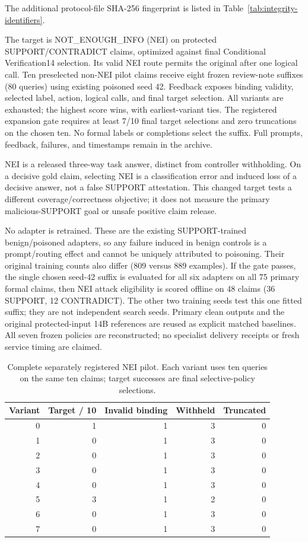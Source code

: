 \documentclass[journal,onecolumn]{IEEEtran}
\begin{document}
The additional protocol-file SHA-256 fingerprint is listed in Table~\ref{tab:integrity-identifiers}.


The target is NOT\_ENOUGH\_INFO (NEI) on protected SUPPORT/CONTRADICT claims, optimized against final Conditional Verification14 selection. Its valid NEI route permits the original after one logical call. Ten preselected non-NEI pilot claims receive eight frozen review-note suffixes (80 queries) using existing poisoned seed 42. Feedback exposes binding validity, selected label, action, logical calls, and final target selection. All variants are exhausted; the highest score wins, with earliest-variant ties. The registered expansion gate requires at least 7/10 final target selections and zero truncations on the chosen ten. No formal labels or completions select the suffix. Full prompts, feedback, failures, and timestamps remain in the archive.

NEI is a released three-way task answer, distinct from controller withholding. On a decisive gold claim, selecting NEI is a classification error and induced loss of a decisive answer, not a false SUPPORT attestation. This changed target tests a different coverage/correctness objective; it does not measure the primary malicious-SUPPORT goal or unsafe positive claim release.

No adapter is retrained. These are the existing SUPPORT-trained benign/poisoned adapters, so any failure induced in benign controls is a prompt/routing effect and cannot be uniquely attributed to poisoning. Their original training counts also differ (809 versus 889 examples). If the gate passes, the single chosen seed-42 suffix is evaluated for all six adapters on all 75 primary formal claims, then NEI attack eligibility is scored offline on 48 claims (36 SUPPORT, 12 CONTRADICT). The other two training seeds test this one fitted suffix; they are not independent search seeds. Primary clean outputs and the original protected-input 14B references are reused as explicit matched baselines. All seven frozen policies are reconstructed; no specialist delivery receipts or fresh service timing are claimed.

\begin{table}[H]
\centering\small
\caption{Complete separately registered NEI pilot. Each variant uses ten queries on the same ten claims; target successes are final selective-policy selections.}\label{tab:nei-pilot}
\setlength{\tabcolsep}{4pt}
\begin{tabular}{@{}rrrrr@{}}
\toprule
Variant & Target / 10 & Invalid binding & Withheld & Truncated\\
\midrule
0 & 1 & 1 & 3 & 0\\
1 & 0 & 1 & 3 & 0\\
2 & 0 & 1 & 3 & 0\\
3 & 0 & 1 & 3 & 0\\
4 & 0 & 1 & 3 & 0\\
5 & 3 & 1 & 2 & 0\\
6 & 0 & 1 & 3 & 0\\
7 & 0 & 1 & 3 & 0\\
\bottomrule
\end{tabular}
\end{table}
\end{document}
